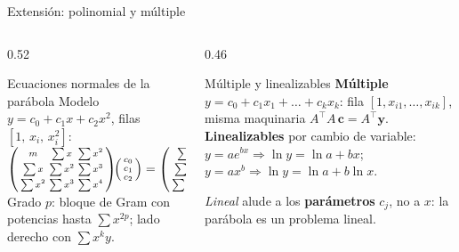 \documentclass[aspectratio=169,10pt]{beamer}
\begin{document}
\begin{frame}{Extensión: polinomial y múltiple}
\begin{columns}[T]
\begin{column}{0.52\textwidth}
\begin{cardgear}{Ecuaciones normales de la parábola}{\faSuperscript}
{\footnotesize Modelo $y=c_0+c_1x+c_2x^2$, filas $[1,\,x_i,\,x_i^2]$:\\[1.0mm]
$\begin{psmallmatrix} m & \sum x & \sum x^2\\[1pt] \sum x & \sum x^2 & \sum x^3\\[1pt] \sum x^2 & \sum x^3 & \sum x^4\end{psmallmatrix}\!\begin{psmallmatrix}c_0\\[1pt] c_1\\[1pt] c_2\end{psmallmatrix}=\begin{psmallmatrix}\sum y\\[1pt] \sum xy\\[1pt] \sum x^2y\end{psmallmatrix}$\\[1.6mm]
Grado $p$: bloque de Gram con potencias hasta $\sum x^{2p}$; lado derecho con $\sum x^{k}y$.}
\end{cardgear}
\end{column}
\begin{column}{0.46\textwidth}
\begin{cardidea}{Múltiple y linealizables}{\faListUl}
{\footnotesize \textbf{Múltiple} $y=c_0+c_1x_1+\dots+c_kx_k$: fila $[1,x_{i1},\dots,x_{ik}]$, misma maquinaria $A^{\!\top}\!A\,\mathbf c=A^{\!\top}\mathbf y$.\\[1.0mm]
\textbf{Linealizables} por cambio de variable:\\[0.3mm]
$y=ae^{bx}\Rightarrow\ln y=\ln a+bx$;\\[0.2mm]
$y=ax^b\Rightarrow\ln y=\ln a+b\ln x$.}
\end{cardidea}
\vspace{1mm}
\begin{cardnota}[\faInfoCircle]
{\footnotesize \emph{Lineal} alude a los \textbf{parámetros} $c_j$, no a $x$: la parábola es un problema lineal.}
\end{cardnota}
\end{column}
\end{columns}
\end{frame}
\end{document}
